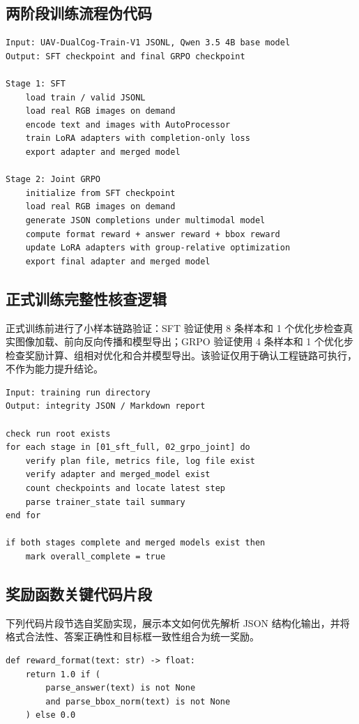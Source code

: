 \begin{thesisappendix}
\subsection{两阶段训练流程伪代码}

\begin{verbatim}
Input: UAV-DualCog-Train-V1 JSONL, Qwen 3.5 4B base model
Output: SFT checkpoint and final GRPO checkpoint

Stage 1: SFT
    load train / valid JSONL
    load real RGB images on demand
    encode text and images with AutoProcessor
    train LoRA adapters with completion-only loss
    export adapter and merged model

Stage 2: Joint GRPO
    initialize from SFT checkpoint
    load real RGB images on demand
    generate JSON completions under multimodal model
    compute format reward + answer reward + bbox reward
    update LoRA adapters with group-relative optimization
    export final adapter and merged model
\end{verbatim}

\subsection{正式训练完整性核查逻辑}

正式训练前进行了小样本链路验证：SFT 验证使用 8 条样本和 1 个优化步检查真实图像加载、前向反向传播和模型导出；GRPO 验证使用 4 条样本和 1 个优化步检查奖励计算、组相对优化和合并模型导出。该验证仅用于确认工程链路可执行，不作为能力提升结论。

\begin{verbatim}
Input: training run directory
Output: integrity JSON / Markdown report

check run root exists
for each stage in [01_sft_full, 02_grpo_joint] do
    verify plan file, metrics file, log file exist
    verify adapter and merged_model exist
    count checkpoints and locate latest step
    parse trainer_state tail summary
end for

if both stages complete and merged models exist then
    mark overall_complete = true
\end{verbatim}

\subsection{奖励函数关键代码片段}
\label{app:reward-code}

下列代码片段节选自奖励实现，展示本文如何优先解析 JSON 结构化输出，并将格式合法性、答案正确性和目标框一致性组合为统一奖励。
\begin{verbatim}
def reward_format(text: str) -> float:
    return 1.0 if (
        parse_answer(text) is not None
        and parse_bbox_norm(text) is not None
    ) else 0.0


\end{verbatim}
\end{thesisappendix}
